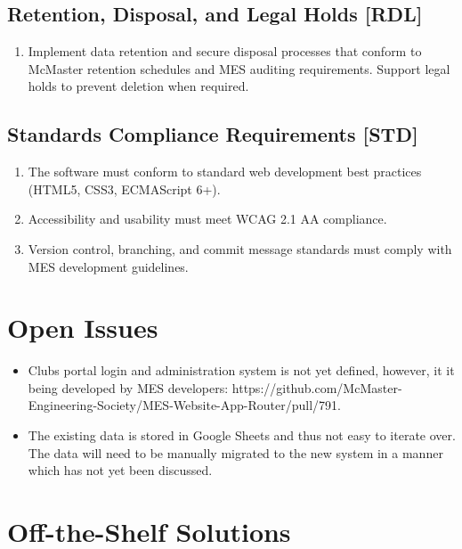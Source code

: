 \documentclass[12pt]{article}
\begin{document}
\begin{enumerate}
\subsection{Retention, Disposal, and Legal Holds [RDL]}
\begin{enumerate}
  \item Implement data retention and secure disposal processes that conform to McMaster retention schedules and MES auditing requirements. Support legal holds to prevent deletion when required.
\end{enumerate}

\subsection{Standards Compliance Requirements [STD]}
\begin{enumerate}
    \item The software must conform to standard web development best practices (HTML5, CSS3, ECMAScript 6+).
    \item Accessibility and usability must meet WCAG 2.1 AA compliance.
    \item Version control, branching, and commit message standards must comply with MES development guidelines.
\end{enumerate}


\section{Open Issues}
  \begin{itemize}
    \item Clubs portal login and administration system is not yet defined, however, it it being developed by MES developers: https://github.com/McMaster-Engineering-Society/MES-Website-App-Router/pull/791.
    \item The existing data is stored in Google Sheets and thus not easy to iterate over. The data will need to be manually migrated to the new system in a manner which has not yet been discussed.
  \end{itemize}

\section{Off-the-Shelf Solutions}

\end{enumerate}
\end{document}

